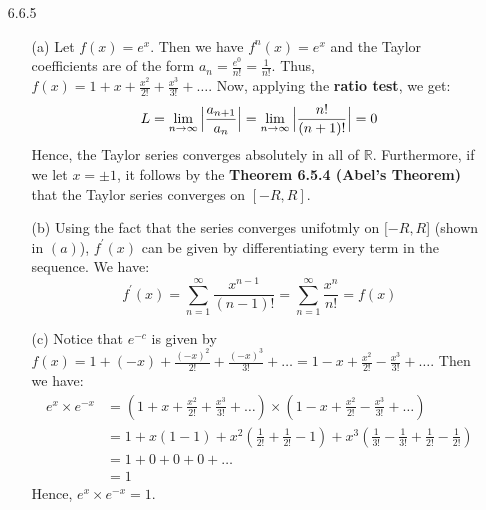 \documentclass[11pt]{article}
\DeclarePairedDelimiter\absb{\Big\lvert}{\Big\rvert}%
\newcommand{\reals}{\mathbb{R}}
\begin{document}
\begin{itemize}
    \item[6.6.5]
        \begin{itemize}
            \item[(a)]
                Let $f(x) = e^x$. Then we have $f^n(x) = e^x$ and the Taylor
                coefficients are of the form $a_n = \frac{e^0}{n!} =
                \frac{1}{n!}$. Thus, $f(x) = 1 + x + \frac{x^2}{2!} +
                \frac{x^3}{3!} + \dots$. Now, applying the \textbf{ratio test},
                we get:
                \begin{equation*}
                    L = \lim_{n \to \infty}{\absb{\frac{a_{n + 1}}{a_n}}}
                        = \lim_{n \to \infty}{\absb{\frac{n!}{(n + 1)!}}}
                        = 0
                \end{equation*}
                Hence, the Taylor series converges absolutely in all of
                $\reals$. Furthermore, if we let $x = \pm 1$, it follows by the
                \textbf{Theorem 6.5.4 (Abel’s Theorem)} that the Taylor series
                converges on $[-R, R]$.

            \item[(b)]
                Using the fact that the series converges unifotmly on $[-R, R$]
                (shown in $(a)$), $f^\prime(x)$ can be given by differentiating
                every term in the sequence. We have:
                \begin{equation*}
                    f^\prime(x) =
                        \sum_{n = 1}^\infty \frac{x^{n - 1}}{(n - 1)!}
                            = \sum_{n = 1}^\infty \frac{x^n}{n!}
                            = f(x)
                \end{equation*}

            \item[(c)]
                Notice that $e^{-c}$ is given by $f(x) = 1 + (-x) +
                \frac{(-x)^2}{2!} + \frac{(-x)^3}{3!} + \dots = 1 - x +
                \frac{x^2}{2!} - \frac{x^3}{3!} + \dots$.
                Then we have:
                \begin{align*}
                    e^x \times e^{-x} &=
                        (1 + x + \frac{x^2}{2!} + \frac{x^3}{3!} + \dots)
                            \times
                        (1 - x + \frac{x^2}{2!} - \frac{x^3}{3!} + \dots)\\
                        &= 1 + x(1 - 1) + x^2(\frac{1}{2!} + \frac{1}{2!} -1)
                            + x^3(\frac{1}{3!} - \frac{1}{3!} + \frac{1}{2!}
                                               - \frac{1}{2!})\\
                        &= 1 + 0 + 0 + 0 + \dots\\
                        &= 1
                \end{align*}
                Hence, $e^x \times e^{-x} = 1$.
        \end{itemize}
\end{itemize}

\end{document}
